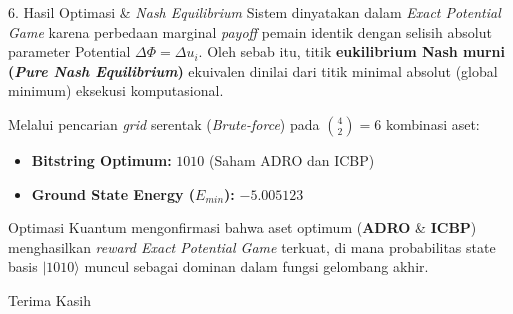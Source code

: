 \begin{frame}{6. Hasil Optimasi \& \textit{Nash Equilibrium}}
Sistem dinyatakan dalam \textit{Exact Potential Game} karena perbedaan marginal \textit{payoff} pemain identik dengan selisih absolut parameter Potential $\Delta \Phi = \Delta u_i$.
Oleh sebab itu, titik \textbf{eukilibrium Nash murni (\textit{Pure Nash Equilibrium})} ekuivalen dinilai dari titik minimal absolut (global minimum) eksekusi komputasional.

Melalui pencarian \textit{grid} serentak (\textit{Brute-force}) pada $\binom{4}{2} = 6$ kombinasi aset:
\begin{itemize}
    \item \textbf{Bitstring Optimum:} $1010$ (Saham ADRO dan ICBP)
    \item \textbf{Ground State Energy ($E_{min}$):} $-5.005123$
\end{itemize}

\vspace{0.3cm}
Optimasi Kuantum mengonfirmasi bahwa aset optimum (\textbf{ADRO} \& \textbf{ICBP}) menghasilkan \textit{reward Exact Potential Game} terkuat, di mana probabilitas state basis $|1010\rangle$ muncul sebagai dominan dalam fungsi gelombang akhir.
\end{frame}

\begin{frame}
\centering \Huge
Terima Kasih
\end{frame}
